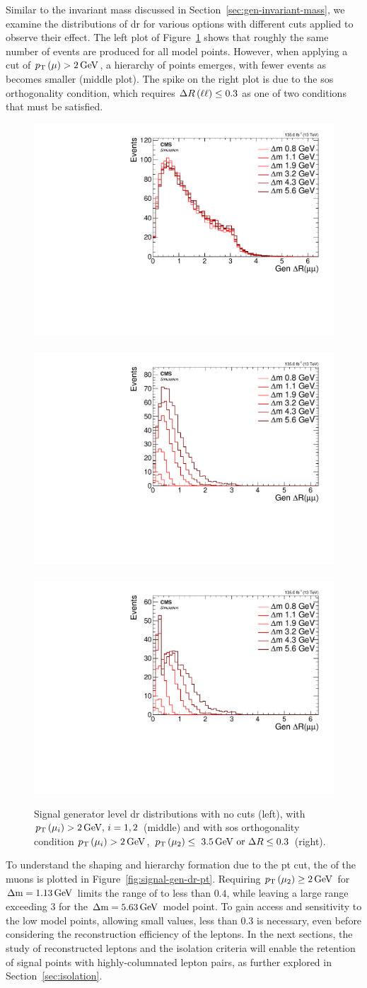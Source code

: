 Similar to the invariant mass discussed in Section~\ref{sec:gen-invariant-mass}, we examine the distributions of \gls{dr} for various \dm options with different cuts applied to observe their effect. The left plot of Figure~\ref{fig:signal-generator-dr} shows that roughly the same number of events are produced for all \dm model points. However, when applying a cut of $p_{\mathrm{T}}\left(\mu\right)>2\,\text{Ge\hspace{-.08em}V}$, a hierarchy of \dm points emerges, with fewer events as \dm becomes smaller (middle plot). The spike on the right plot is due to the \gls{sos} orthogonality condition, which requires $\Delta R\left(\ell\ell\right)\leq 0.3$ as one of two conditions that must be satisfied.

\begin{figure}[!htb]
\centering
\includegraphics[width=0.32\linewidth]{plots/signal_muons_gen/none_gen_deltaR.pdf} \,
\includegraphics[width=0.32\linewidth]{plots/signal_muons_gen/none_gen_deltaR_cut.pdf}  \,
\includegraphics[width=0.32\linewidth]{plots/signal_muons_gen/none_gen_deltaR_orth.pdf} \\
\caption[Signal generator level \DR distributions]{ Signal generator level \gls{dr} distributions with no cuts (left), with $p_{\mathrm{T}}\left(\mu_i\right)>2\,\text{Ge\hspace{-.08em}V},\,i=1,2$ (middle) and with \gls{sos} orthogonality condition $p_{\mathrm{T}}\left(\mu_i\right)>2\,\text{Ge\hspace{-.08em}V}$, $p_{\mathrm{T}}\left(\mu_2\right)\leq~3.5\,\text{Ge\hspace{-.08em}V}\text{ or }\Delta R\leq 0.3$ (right).}
\label{fig:signal-generator-dr}
\end{figure}

To understand the shaping and hierarchy formation due to the \gls{pt} cut, the \pt of the muons is plotted \vs \drll in Figure~\ref{fig:signal-gen-dr-pt}. Requiring $p_{\mathrm{T}}\left(\mu_2\right)\geq 2\,\text{Ge\hspace{-.08em}V}$ for $\Delta\mathrm{m}=1.13\,\text{Ge\hspace{-.08em}V}$ limits the range of \drmm to less than $0.4$, while leaving a large range exceeding 3 for the $\Delta\mathrm{m}=5.63\,\text{Ge\hspace{-.08em}V}$ model point. To gain access and sensitivity to the low \dm model points, allowing small \drll values, less than 0.3 is necessary, even before considering the reconstruction efficiency of the leptons. In the next sections, the study of reconstructed leptons and the isolation criteria will enable the retention of signal points with highly-columnated lepton pairs, as further explored in Section~\ref{sec:isolation}.

